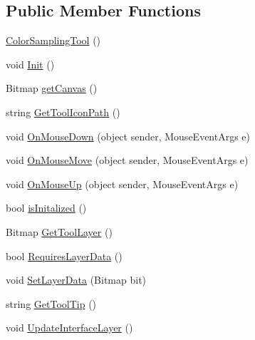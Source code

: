 \subsection*{Public Member Functions}
\begin{DoxyCompactItemize}
\item 
\mbox{\hyperlink{class_paint___program_1_1_color_sampling_tool_afaa3610c8758b8e047064b860472d1c9}{Color\+Sampling\+Tool}} ()
\item 
void \mbox{\hyperlink{class_paint___program_1_1_color_sampling_tool_ae6d5a44df3a4394f7da352d1170bea54}{Init}} ()
\item 
Bitmap \mbox{\hyperlink{class_paint___program_1_1_color_sampling_tool_a1824a80560c1dcfedfe12a326f0eae9c}{get\+Canvas}} ()
\item 
string \mbox{\hyperlink{class_paint___program_1_1_color_sampling_tool_a319d9e67417e473d0f76b8cafc1d7c2b}{Get\+Tool\+Icon\+Path}} ()
\item 
void \mbox{\hyperlink{class_paint___program_1_1_color_sampling_tool_a511da95eb2072dc913d8053ba405fb2a}{On\+Mouse\+Down}} (object sender, Mouse\+Event\+Args e)
\item 
void \mbox{\hyperlink{class_paint___program_1_1_color_sampling_tool_a509ae51233092f2722e44301897ee085}{On\+Mouse\+Move}} (object sender, Mouse\+Event\+Args e)
\item 
void \mbox{\hyperlink{class_paint___program_1_1_color_sampling_tool_a3365d954290cfb30d73c8a7c50fa7b72}{On\+Mouse\+Up}} (object sender, Mouse\+Event\+Args e)
\item 
bool \mbox{\hyperlink{class_paint___program_1_1_color_sampling_tool_a9ee3268dc9b5e8f36696055519a78a4c}{is\+Initalized}} ()
\item 
Bitmap \mbox{\hyperlink{class_paint___program_1_1_color_sampling_tool_aa0e2ac4d50f9a46c0d83a226e9e701c8}{Get\+Tool\+Layer}} ()
\item 
bool \mbox{\hyperlink{class_paint___program_1_1_color_sampling_tool_a68b28bfa791d073d5042b925261b6417}{Requires\+Layer\+Data}} ()
\item 
void \mbox{\hyperlink{class_paint___program_1_1_color_sampling_tool_a7f795564ca0d4df4287b2fb9a11891f4}{Set\+Layer\+Data}} (Bitmap bit)
\item 
string \mbox{\hyperlink{class_paint___program_1_1_color_sampling_tool_a6d26407d4a5040f66c417c7ccaf75793}{Get\+Tool\+Tip}} ()
\item 
void \mbox{\hyperlink{class_paint___program_1_1_color_sampling_tool_a0f2d672005a62b9ac04889c7a14cfcd0}{Update\+Interface\+Layer}} ()
\end{DoxyCompactItemize}
